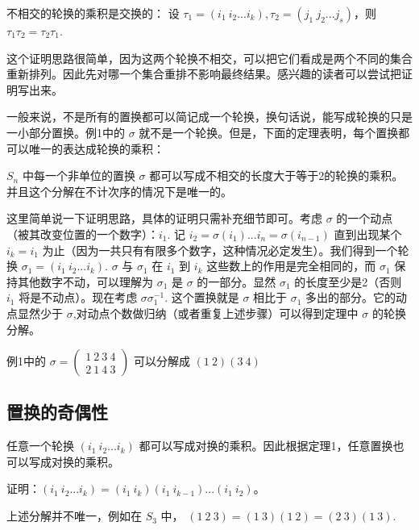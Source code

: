 \begin{lemma}{}
不相交的轮换的乘积是交换的： 设 $\tau_1=(i_1\ i_2...i_k), \tau_2=(j_1\ j_2...j_s)$，则 $\tau_1\tau_2=\tau_2\tau_1$.
\end{lemma}
这个证明思路很简单，因为这两个轮换不相交，可以把它们看成是两个不同的集合重新排列。因此先对哪一个集合重排不影响最终结果。感兴趣的读者可以尝试把证明写出来。

一般来说，不是所有的置换都可以简记成一个轮换，换句话说，能写成轮换的只是一小部分置换。例1中的 $\sigma$ 就不是一个轮换。但是，下面的定理表明，每个置换都可以唯一的表达成轮换的乘积：
\begin{theorem}{}\label{the_permu_2}
$S_n$ 中每一个非单位的置换 $\sigma$ 都可以写成不相交的长度大于等于2的轮换的乘积。并且这个分解在不计次序的情况下是唯一的。
\end{theorem}
这里简单说一下证明思路，具体的证明只需补充细节即可。考虑 $\sigma$ 的一个动点（被其改变位置的一个数字）：$i_1$. 记 $i_2=\sigma(i_1)...i_n=\sigma(i_{n-1})$ 直到出现某个 $i_k=i_1$ 为止（因为一共只有有限多个数字，这种情况必定发生）。我们得到一个轮换 $\sigma_1=(i_1\ i_2...i_k)$. $\sigma$ 与 $\sigma_1$ 在 $i_1$ 到 $i_k$ 这些数上的作用是完全相同的，而 $\sigma_1$ 保持其他数字不动，可以理解为 $\sigma_1$ 是 $\sigma$ 的一部分。显然 $\sigma_1$ 的长度至少是2（否则 $i_1$ 将是不动点）。现在考虑 $\sigma\sigma_1^{-1}$. 这个置换就是 $\sigma$ 相比于 $\sigma_1$ 多出的部分。它的动点显然少于 $\sigma$,对动点个数做归纳（或者重复上述步骤）可以得到定理中 $\sigma$ 的轮换分解。

\begin{example}{}
例1中的 $\sigma=\begin{pmatrix}
1\ 2\ 3\ 4\\ 2\ 1\ 4\ 3
\end{pmatrix}$ 可以分解成 $(1\ 2)(3\ 4)$
\end{example}

\subsection{置换的奇偶性}

\begin{lemma}{}\label{lem_permu_1}
任意一个轮换 $(i_1\ i_2...i_k)$ 都可以写成对换的乘积。因此根据定理1，任意置换也可以写成对换的乘积。
\end{lemma}
证明：$(i_1\ i_2...i_k)=(i_1\ i_k)(i_1\ i_{k-1})...(i_1\ i_2)$。

\begin{example}{}
上述分解并不唯一，例如在 $S_3$ 中，
$(1\ 2\ 3)=(1\ 3)(1\ 2)=(2\ 3)(1\ 3)$.
\end{example}


